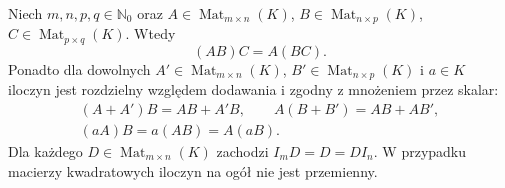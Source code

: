 \begin{twierdzenie}
\label{thm:lin4-rachunek-macierzy}
Niech \(m,n,p,q\in\mathbb N_0\) oraz
\(A\in\operatorname{Mat}_{m\times n}(K)\),
\(B\in\operatorname{Mat}_{n\times p}(K)\),
\(C\in\operatorname{Mat}_{p\times q}(K)\).
Wtedy
\[
 (AB)C=A(BC).
\]
Ponadto dla dowolnych
\(A'\in\operatorname{Mat}_{m\times n}(K)\),
\(B'\in\operatorname{Mat}_{n\times p}(K)\)
i \(a\in K\) iloczyn jest rozdzielny
względem dodawania i zgodny z mnożeniem
przez skalar:
\[
 \begin{gathered}
 (A+A')B=AB+A'B,\qquad
 A(B+B')=AB+AB',\\
 (aA)B=a(AB)=A(aB).
 \end{gathered}
\]
Dla każdego \(D\in\operatorname{Mat}_{m\times n}(K)\)
zachodzi \(I_mD=D=DI_n\).
W przypadku macierzy kwadratowych
iloczyn na ogół nie jest przemienny.
\end{twierdzenie}
